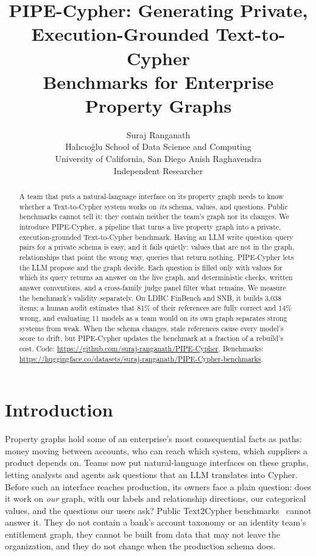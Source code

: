 \documentclass[11pt]{article}
\title{PIPE-Cypher: Generating Private, Execution-Grounded Text-to-Cypher\\Benchmarks for Enterprise Property Graphs}
\author{
Suraj Ranganath\\
Hal{\i}c{\i}o\u{g}lu School of Data Science and Computing\\
University of California, San Diego
\And
Anish Raghavendra\\
Independent Researcher
}
\begin{document}
\maketitle

\begin{abstract}
A team that puts a natural-language interface on its property graph needs to know whether a Text-to-Cypher system works on \emph{its} schema, values, and questions. Public benchmarks cannot tell it: they contain neither the team's graph nor its changes. We introduce PIPE-Cypher, a pipeline that turns a live property graph into a private, execution-grounded Text-to-Cypher benchmark. Having an LLM write question--query pairs for a private schema is easy, and it fails quietly: values that are not in the graph, relationships that point the wrong way, queries that return nothing. PIPE-Cypher lets the LLM propose and the graph decide. Each question is filled only with values for which its query returns an answer on the live graph, and deterministic checks, written answer conventions, and a cross-family judge panel filter what remains. We measure the benchmark's validity separately. On LDBC FinBench and SNB, it builds 3,038 items; a human audit estimates that 81\% of their references are fully correct and 14\% wrong, and evaluating 11 models as a team would on its own graph separates strong systems from weak. When the schema changes, stale references cause every model's score to drift, but PIPE-Cypher updates the benchmark at a fraction of a rebuild's cost. Code: \url{https://github.com/suraj-ranganath/PIPE-Cypher}. Benchmarks: \url{https://huggingface.co/datasets/suraj-ranganath/PIPE-Cypher-benchmarks}.
\end{abstract}

\section{Introduction}
Property graphs hold some of an enterprise's most consequential facts as paths: money moving between accounts, who can reach which system, which suppliers a product depends on. Teams now put natural-language interfaces on these graphs, letting analysts and agents ask questions that an LLM translates into Cypher. Before such an interface reaches production, its owners face a plain question: does it work on \emph{our} graph, with our labels and relationship directions, our categorical values, and the questions our users ask? Public Text2Cypher benchmarks~\citep{text2cypher2025,cypherbench2025,mindthequery2025} cannot answer it. They do not contain a bank's account taxonomy or an identity team's entitlement graph, they cannot be built from data that may not leave the organization, and they do not change when the production schema does.
\end{document}
